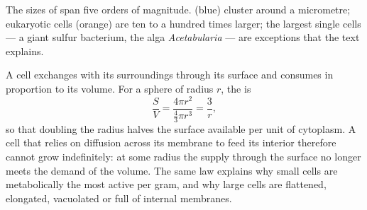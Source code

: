 \begin{omfigure}

{\small The sizes of  span five orders of
magnitude.  (blue) cluster around a micrometre; eukaryotic
cells (orange) are ten to a hundred times larger; the largest single
cells --- a giant sulfur bacterium, the alga \emph{Acetabularia} ---
are exceptions that the text explains.}
\end{omfigure}

\begin{proposition}\label{prop:b2:unicellular-diversity:surface}
A cell exchanges with its surroundings through its surface and
consumes in proportion to its volume. For a sphere of radius $r$,
the \emph{} is
\[
\frac{S}{V} = \frac{4\pi r^2}{\tfrac{4}{3}\pi r^3} = \frac{3}{r},
\]
so that doubling the radius halves the surface available per unit of
cytoplasm. A cell that relies on diffusion across its membrane to
feed its interior therefore cannot grow indefinitely: at some radius
the supply through the surface no longer meets the demand of the
volume. The same law explains why small cells are metabolically the
most active per gram, and why large cells are flattened, elongated,
vacuolated or full of internal membranes.
\end{proposition}

